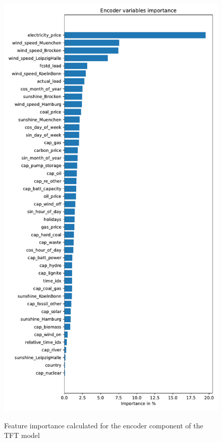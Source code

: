 \documentclass[a4paper]{article}
\begin{document}
    \begin{figure}
\centering
{\includegraphics[keepaspectratio]{"./src/encoder.pdf"}}
\caption{Feature importance calculated for the encoder component of the
TFT model}
\end{figure}
\end{document}
